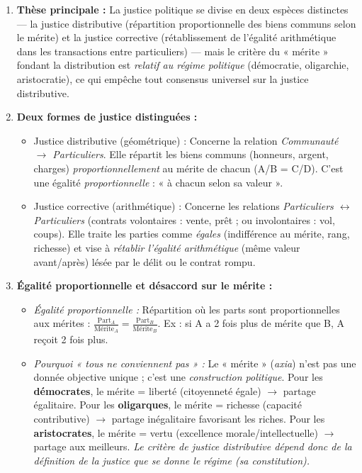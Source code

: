 \documentclass[11pt]{article}
\newcommand{\cle}[1]{{\popxbold\color{popdark}#1}}
\begin{document}
\begin{corrige}
\begin{enumerate}
\item \textbf{Thèse principale :} La justice politique se divise en deux espèces distinctes — la \cle{justice distributive} (répartition proportionnelle des biens communs selon le mérite) et la \cle{justice corrective} (rétablissement de l'égalité arithmétique dans les transactions entre particuliers) — mais le critère du « mérite » fondant la distribution est \emph{relatif au régime politique} (démocratie, oligarchie, aristocratie), ce qui empêche tout consensus universel sur la justice distributive.
\item \textbf{Deux formes de justice distinguées :}
      \begin{itemize}
      \item \cle{Justice distributive (géométrique) :} Concerne la relation \emph{Communauté $\to$ Particuliers}. Elle répartit les biens communs (honneurs, argent, charges) \emph{proportionnellement} au mérite de chacun (A/B = C/D). C'est une égalité \emph{proportionnelle} : « à chacun selon sa valeur ».
      \item \cle{Justice corrective (arithmétique) :} Concerne les relations \emph{Particuliers $\leftrightarrow$ Particuliers} (contrats volontaires : vente, prêt ; ou involontaires : vol, coups). Elle traite les parties comme \emph{égales} (indifférence au mérite, rang, richesse) et vise à \emph{rétablir l'égalité arithmétique} (même valeur avant/après) lésée par le délit ou le contrat rompu.
      \end{itemize}
\item \textbf{Égalité proportionnelle et désaccord sur le mérite :}
      \begin{itemize}
      \item \emph{Égalité proportionnelle :} Répartition où les parts sont proportionnelles aux mérites : $\frac{\text{Part}_A}{\text{Mérite}_A} = \frac{\text{Part}_B}{\text{Mérite}_B}$. Ex : si A a 2 fois plus de mérite que B, A reçoit 2 fois plus.
      \item \emph{Pourquoi « tous ne conviennent pas » :} Le « mérite » (\emph{axia}) n'est pas une donnée objective unique ; c'est une \emph{construction politique}. Pour les \textbf{démocrates}, le mérite = \cle{liberté} (citoyenneté égale) $\to$ partage égalitaire. Pour les \textbf{oligarques}, le mérite = \cle{richesse} (capacité contributive) $\to$ partage inégalitaire favorisant les riches. Pour les \textbf{aristocrates}, le mérite = \cle{vertu} (excellence morale/intellectuelle) $\to$ partage aux meilleurs. \emph{Le critère de justice distributive dépend donc de la définition de la justice que se donne le régime (sa constitution).}

\end{itemize}
\end{enumerate}
\end{corrige}
\end{document}

